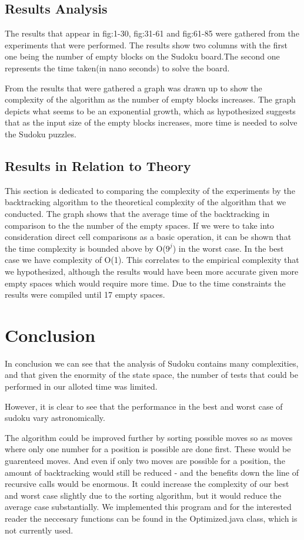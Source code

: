 \documentclass[12pt]{article}
\begin{document}
\subsection{Results Analysis}
The results that appear in fig:1-30, fig:31-61 and fig:61-85 were gathered from the experiments that were performed. The results show two columns with the first one being the number of empty blocks on the Sudoku board.The second one represents the time taken(in nano seconds) to solve the board.

From the results that were gathered a graph was drawn up to show the complexity of the algorithm as the number of empty blocks increases.
The graph depicts what seems to be an exponential growth, which as hypothesized suggests that as the input size of the empty blocks increases, more time is needed to solve the Sudoku puzzles. 

\subsection{Results in Relation to Theory}
This section is dedicated to comparing the complexity of the experiments by the backtracking algorithm to the theoretical complexity of the algorithm that we conducted. The graph shows that the average time of the backtracking in comparison to the the number of the empty spaces.
If we were to take into consideration direct cell comparisons as a basic operation, it can be shown that the time complexity is bounded
above by O($9^j$) in the worst case.
In the best case we have complexity of O(1). This correlates to the empirical complexity that we hypothesized, although the results would have been more accurate given more empty spaces which would require more time. Due to the time constraints the results were compiled until 17 empty spaces.   

\section{Conclusion}
In conclusion we can see that the analysis of Sudoku contains many complexities, and that given the enormity of the state space, the number of tests that could be performed in our alloted time was limited.

However, it is clear to see that the performance in the best and worst case of sudoku vary astronomically.

The algorithm could be improved further by sorting possible moves so as moves where only one number for a position is possible are done first. These would be guarenteed moves. And even if only two moves are possible for a position, the amount of backtracking would still be reduced - and the benefits down the line of recursive calls would be enormous. It could increase the complexity of our best and worst case slightly due to the sorting algorithm, but it would reduce the average case substantially. We implemented this program and for the interested reader the neccesary functions can be found in the Optimized.java class, which is not currently used.
\end{document}
